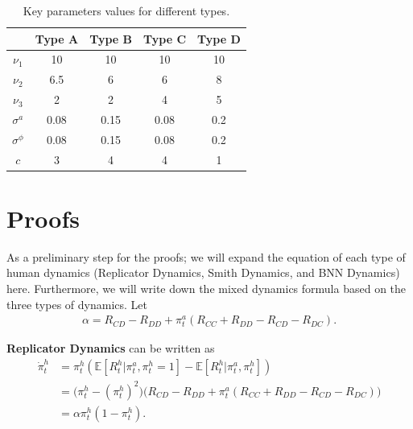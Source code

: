 \documentclass[letterpaper]{article} %
\begin{document}
\begin{table}[h!]
  \begin{center}
    \begin{tabular}{c|c|c|c|c}
      & Type A & Type B & Type C & Type D \\
      \hline
      $\nu_1$ & 10 & 10 & 10 & 10 \\\hline
      $\nu_2$ & 6.5 & 6 & 6 & 8 \\\hline
      $\nu_3$ & 2 & 2 & 4 & 5\\\hline
      $\sigma^a$ & 0.08 & 0.15 & 0.08 & 0.2 \\\hline
      $\sigma^\phi$ & 0.08 & 0.15 & 0.08 & 0.2 \\\hline
      $c$ & 3 & 4 & 4 & 1
    \end{tabular}
    \caption{Key parameters values for different types.}
    \label{tab:all_params2}
  \end{center}
\end{table}

\section{Proofs}
As a preliminary step for the proofs; we will expand the equation of each type of human dynamics (Replicator Dynamics, Smith Dynamics, and BNN Dynamics) here. Furthermore, we will write down the mixed dynamics formula based on the three types of dynamics. Let
\begin{align}
\label{eq:alpha_def}
    \alpha = R_{CD} - R_{DD} + \pi^a_t (R_{CC}  +R_{DD}-R_{CD}-R_{DC} ).
\end{align}

\textbf{Replicator Dynamics} can be written as
\begin{align}
\dot{\pi}^h_{t} &= \pi^h_{t}(\mathbb{E}[R^h_t|\pi^a_t, \pi^h_t = 1] - \mathbb{E}[R^h_t|\pi^a_t,\pi^h_t]) \\
&= \bigg(\pi^h_{t} - (\pi^h_{t})^2\bigg)
\bigg(R_{CD} - R_{DD} + \pi^a_t (R_{CC}  +R_{DD}-R_{CD}-R_{DC} ) \bigg) \\
&= \alpha \pi^h_{t}(1 - \pi^h_{t})  \label{eq:replicator}.
\end{align}
\end{document}
